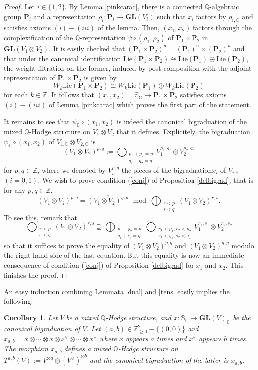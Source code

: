 \documentclass[10pt]{article}
\numberwithin{equation}{subsection}
\theoremstyle{plain}
\newtheorem{corollary}[theorem]{Corollary}
\theoremstyle{definition}
\theoremstyle{remark}
\newcommand{\Z}{\mathbb Z}
\newcommand{\Q}{\mathbb Q}
\newcommand{\C}{\mathbb C}
\newcommand{\s}{\mathbb S}
\newcommand{\pp}{\mathbf P}
\newcommand{\gl}{\mathbf{GL}}
\begin{document}
\begin{proof}
Let $i \in \{1,2\}$. By Lemma \ref{pinkcarac}, there is a connected $\Q$-algebraic group $\pp_i$ and a representation $\rho_i: \pp_i \rightarrow \gl(V_i)$ such that $x_i$ factors by $\rho_{i,\C}$ and satisfies axioms $(i) - (iii)$ of the lemma. Then, $(x_1,x_2)$ factors through the complexification of the $\Q$-representation $\psi \circ (\rho_1,\rho_2)$ of $\pp_1 \times \pp_2$ in $\gl(V_1 \otimes V_2)$. It is easily checked that $(\pp_1 \times \pp_2)^u = (\pp_1)^u \times (\pp_2)^u$ and that under the canonical identification $\mathrm{Lie}(\pp_1 \times \pp_2) \cong \mathrm{Lie}(\pp_1) \oplus \mathrm{Lie}(\pp_2)$, the weight filtration on the former, induced by post-composition with the adjoint representation of $\pp_1 \times \pp_2$  is given by
\[
W_k \mathrm{Lie}(\pp_1 \times \pp_2) \cong W_k \mathrm{Lie}(\pp_1) \oplus W_k \mathrm{Lie}(\pp_2)
\]
for each $k \in \Z$. It follows that $(x_1,x_2) = \s_\C \rightarrow \pp_1 \times \pp_2$ satisfies axioms $(i) - (iii)$ of Lemma \ref{pinkcarac} which proves the first part of the statement.

It remains to see that $\psi_\C \circ (x_1, x_2)$ is indeed the canonical bigraduation of the mixed $\Q$-Hodge structure on $V_1 \otimes V_2$ that it defines. Explicitely, the bigraduation $\psi_\C \circ (x_1,x_2)$ of $V_{1,\C} \otimes V_{2,\C}$ is
\[
(V_1 \otimes V_2)^{p,q} := \bigoplus_{\substack{p_1 + p_2 = p \\ q_1 + q_2 = q}} V_1^{p_1,q_1} \otimes V_2^{p_2,q_2}
\]
for $p,q \in \Z$, where we denoted by $V_i^{p,q}$ the pieces of the bigraduation$x_i$ of $V_{i,\C}$ $(i=0,1)$. We wish to prove condition (\ref{conj}) of Proposition \ref{delbigrad}, that is for any $p,q \in \Z$,
\[
(V_1 \otimes V_2)^{p,q} = \overline{(V_1 \otimes V_2)^{q,p}} \mod \bigoplus_{\substack{r<p \\ s<q}} (V_1 \otimes V_2)^{r,s}.
\]
To see this, remark that
\[
\bigoplus_{\substack{r<p \\ s<q}} (V_1 \otimes V_2)^{r,s}  \supseteq \bigoplus_{\substack{p_1+p_2 =p\\q_1+q_2=q}} \bigoplus_{\substack{r_1< p_1, r_2<p_2 \\ s_1 < q_1, s_2<q_2}} V_1^{r_1,s_1} \otimes V_2^{r_2,s_2} 
\]
so that it suffices to prove the equality of $(V_1 \otimes V_2)^{p,q}$ and  $\overline{(V_1 \otimes V_2)^{q,p}}$ modulo the right hand side of the last equation. But this equality is now an immediate consequence of condition (\ref{conj}) of Proposition \ref{delbigrad} for $x_1$ and $x_2$. This finishes the proof.
\end{proof}
An easy induction combining Lemmata \ref{dual} and \ref{tens} easily implies the following:
\begin{corollary}\label{arbtens}
Let $V$ be a mixed $\Q$-Hodge structure, and $x : \s_\C \rightarrow \gl(V)_\C$ be the canonical bigraduation of $V$. Let $(a,b) \in \Z_{\geqslant 0}^2 - \{(0,0)\}$ and $x_{a,b} = x\otimes \cdots \otimes x \otimes x^\vee \otimes \cdots \otimes x^\vee$ where $x$ appears $a$ times and $x^\vee$ appears $b$ times. The morphism $x_{a,b}$ defines a mixed $\Q$-Hodge structure on $T^{a,b}(V) := V^{\otimes a} \otimes (V^{\vee})^{\otimes b}$ and the canonical bigraduation of the latter is $x_{a,b}$.
\end{corollary}
\end{document}
